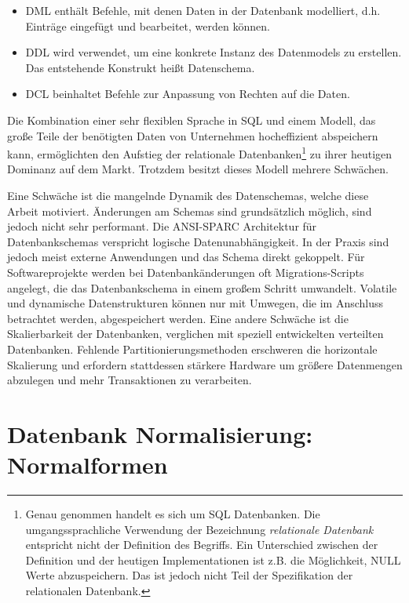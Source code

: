 \begin{itemize}
\item \ac{DML}
enthält Befehle, mit denen Daten in der Datenbank modelliert, d.h. Einträge eingefügt und bearbeitet, werden können.

\item \ac{DDL}
wird verwendet, um eine konkrete Instanz des Datenmodels zu erstellen. Das entstehende Konstrukt heißt Datenschema.

\item \ac{DCL}
beinhaltet Befehle zur Anpassung von Rechten auf die Daten.
\end{itemize}

Die Kombination einer sehr flexiblen Sprache in SQL und einem Modell, das große Teile der benötigten Daten von Unternehmen hocheffizient abspeichern kann, ermöglichten den Aufstieg der relationale Datenbanken\footnote{Genau genommen handelt es sich um SQL Datenbanken. Die umgangssprachliche Verwendung der Bezeichnung \textit{relationale Datenbank} entspricht nicht der Definition des Begriffs. Ein Unterschied zwischen der Definition und der heutigen Implementationen ist z.B. die Möglichkeit, NULL Werte abzuspeichern. Das ist jedoch nicht Teil der Spezifikation der relationalen Datenbank.} zu ihrer heutigen Dominanz auf dem Markt. Trotzdem besitzt dieses Modell mehrere Schwächen.

Eine Schwäche ist die mangelnde Dynamik des Datenschemas, welche diese Arbeit motiviert. Änderungen am Schemas sind grundsätzlich möglich, sind jedoch nicht sehr performant. Die ANSI-SPARC Architektur für Datenbankschemas verspricht logische Datenunabhängigkeit. In der Praxis sind jedoch meist externe Anwendungen und das Schema direkt gekoppelt. Für Softwareprojekte werden bei Datenbankänderungen oft Migrations-Scripts angelegt, die das Datenbankschema in einem großem Schritt umwandelt. Volatile und dynamische Datenstrukturen können nur mit Umwegen, die im Anschluss betrachtet werden, abgespeichert werden.
Eine andere Schwäche ist die Skalierbarkeit der Datenbanken, verglichen mit speziell entwickelten verteilten Datenbanken\cite{Pokorny.2013}. Fehlende Partitionierungsmethoden erschweren die horizontale Skalierung und erfordern stattdessen stärkere Hardware um größere Datenmengen abzulegen und mehr Transaktionen zu verarbeiten.  


\section{Datenbank Normalisierung: Normalformen}



